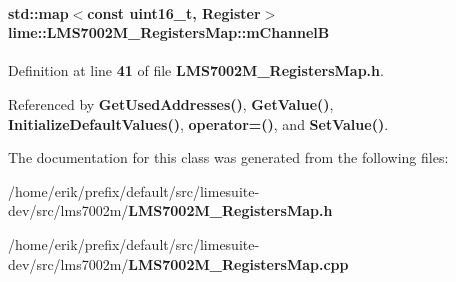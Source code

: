 \paragraph[{m\+ChannelB}]{\setlength{\rightskip}{0pt plus 5cm}std\+::map$<$const uint16\+\_\+t, {\bf Register}$>$ lime\+::\+L\+M\+S7002\+M\+\_\+\+Registers\+Map\+::m\+ChannelB\hspace{0.3cm}{\ttfamily [protected]}}\label{classlime_1_1LMS7002M__RegistersMap_a28f3d5c904bfe2efcb069fe530b614ce}


Definition at line {\bf 41} of file {\bf L\+M\+S7002\+M\+\_\+\+Registers\+Map.\+h}.



Referenced by {\bf Get\+Used\+Addresses()}, {\bf Get\+Value()}, {\bf Initialize\+Default\+Values()}, {\bf operator=()}, and {\bf Set\+Value()}.



The documentation for this class was generated from the following files\+:\begin{DoxyCompactItemize}
\item 
/home/erik/prefix/default/src/limesuite-\/dev/src/lms7002m/{\bf L\+M\+S7002\+M\+\_\+\+Registers\+Map.\+h}\item 
/home/erik/prefix/default/src/limesuite-\/dev/src/lms7002m/{\bf L\+M\+S7002\+M\+\_\+\+Registers\+Map.\+cpp}\end{DoxyCompactItemize}
